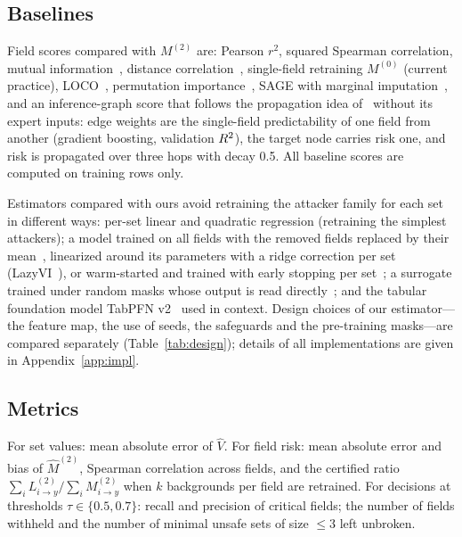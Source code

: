 \subsection{Baselines}
Field scores compared with $M^{(2)}$ are: Pearson $r^2$, squared Spearman correlation, mutual
information~\cite{kraskov2004mi}, distance correlation~\cite{szekely2007dcor}, single-field
retraining $M^{(0)}$ (current practice), LOCO~\cite{lei2018loco}, permutation
importance~\cite{breiman2001rf}, SAGE with marginal imputation~\cite{covert2020sage}, and an
inference-graph score that follows the propagation idea of~\cite{hu2026ignn} without its expert
inputs: edge weights are the single-field predictability of one field from another (gradient
boosting, validation $R^2$), the target node carries risk one, and risk is propagated over three
hops with decay 0.5. All baseline scores are computed on training rows only.

Estimators compared with ours avoid retraining the attacker family for each set in different ways:
per-set linear and quadratic regression (retraining the simplest attackers); a model trained on all fields with the removed
fields replaced by their mean~\cite{williamson2020spvim}, linearized around its parameters with a ridge correction per set
(LazyVI~\cite{gao2022lazyvi}), or warm-started and trained with early stopping per set~\cite{sun2025warmstart}; a
surrogate trained under random masks whose output is read directly~\cite{covert2021explaining,jethani2022fastshap}; and the
tabular foundation model TabPFN v2~\cite{hollmann2025tabpfn} used in context. Design choices of our estimator---the feature
map, the use of seeds, the safeguards and the pre-training masks---are compared separately (Table~\ref{tab:design}); details
of all implementations are given in Appendix~\ref{app:impl}.

\subsection{Metrics}
For set values: mean absolute error of $\hat V$. For field risk: mean absolute error and bias of
$\hat M^{(2)}$, Spearman correlation across fields, and the certified ratio
$\sum_i L^{(2)}_{i\to y}/\sum_i M^{(2)}_{i\to y}$ when $k$ backgrounds per field are retrained.
For decisions at thresholds $\tau\in\{0.5,0.7\}$: recall and precision of critical fields; the
number of fields withheld and the number of minimal unsafe sets of size $\le 3$ left unbroken.
